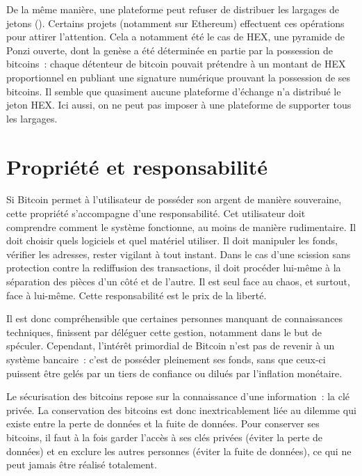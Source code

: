 De la même manière, une plateforme peut refuser de distribuer les largages de jetons (). Certains projets (notamment sur Ethereum) effectuent ces opérations pour attirer l'attention. Cela a notamment été le cas de HEX, une pyramide de Ponzi ouverte, dont la genèse a été déterminée en partie par la possession de bitcoins~: chaque détenteur de bitcoin pouvait prétendre à un montant de HEX proportionnel en publiant une signature numérique prouvant la possession de ses bitcoins. Il semble que quasiment aucune plateforme d'échange n'a distribué le jeton HEX. Ici aussi, on ne peut pas imposer à une plateforme de supporter tous les largages. 

\section*{Propriété et responsabilité}

Si Bitcoin permet à l'utilisateur de posséder son argent de manière souveraine, cette propriété s'accompagne d'une responsabilité. Cet utilisateur doit comprendre comment le système fonctionne, au moins de manière rudimentaire. Il doit choisir quels logiciels et quel matériel utiliser. Il doit manipuler les fonds, vérifier les adresses, rester vigilant à tout instant. Dans le cas d'une scission sans protection contre la rediffusion des transactions, il doit procéder lui-même à la séparation des pièces d'un côté et de l'autre. Il est seul face au chaos, et surtout, face à lui-même. Cette responsabilité est le prix de la liberté.

Il est donc compréhensible que certaines personnes manquant de connaissances techniques, finissent par déléguer cette gestion, notamment dans le but de spéculer. Cependant, l'intérêt primordial de Bitcoin n'est pas de revenir à un système bancaire~: c'est de posséder pleinement ses fonds, sans que ceux-ci puissent être gelés par un tiers de confiance ou dilués par l'inflation monétaire. 

Le sécurisation des bitcoins repose sur la connaissance d'une information~: la clé privée. La conservation des bitcoins est donc inextricablement liée au dilemme qui existe entre la perte de données et la fuite de données. Pour conserver ses bitcoins, il faut à la fois garder l'accès à ses clés privées (éviter la perte de données) et en exclure les autres personnes (éviter la fuite de données), ce qui ne peut jamais être réalisé totalement.

